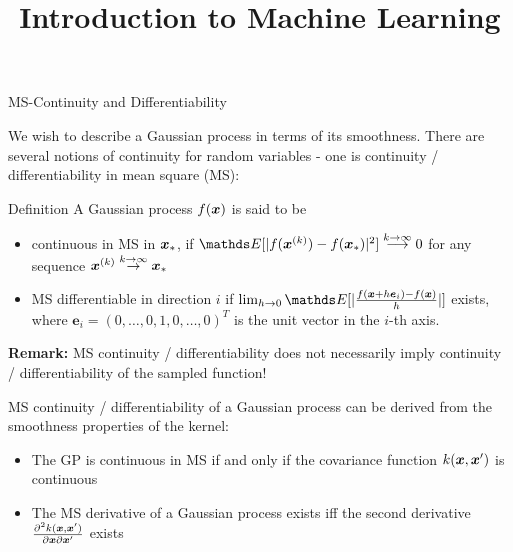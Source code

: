 




\newcommand{\titlefigure}{figure_man/up-crossings.png}
\newcommand{\learninggoals}{
  \item \textcolor{blue}{XXX}
  \item \textcolor{blue}{XXX}
}

\title{Introduction to Machine Learning}
\date{}




\begin{vbframe}{MS-Continuity and Differentiability}

We wish to describe a Gaussian process in terms of its smoothness. There are several notions of continuity for random variables - one is continuity / differentiability in mean square (MS): 

\begin{block}{Definition}
A Gaussian process $f(\bm{x})$ is said to be 
\begin{itemize}
\item continuous in MS in $\bm{x}_*$, if $\E[|f(\xv^{(k)}) - f(\xv_*)|^2] \overset{k \to \infty}{\longrightarrow} 0$ for any sequence $\bm{x}^{(k)} \overset{k \to \infty}{\to} \bm{x}_*$
\item MS differentiable in direction $i$ if $\lim_{h\to 0}\E[|\frac{f(\xv + h\bm{e}_i) - f(\xv)}{h}|]$ exists, where $\bm{e}_i = (0,\dots,0,1,0,\dots,0)^T$ is the unit vector in the $i$-th axis.
\end{itemize}
\end{block}

\textbf{Remark:} MS continuity / differentiability does not necessarily imply continuity / differentiability of the sampled function! 

\framebreak

MS continuity / differentiability of a Gaussian process can be derived from the smoothness properties of the kernel:

\begin{itemize}
\item The GP is continuous in MS if and only if the covariance function $k(\bm{x}, \bm{x}
^\prime)$ is continuous 
\item The MS derivative of a Gaussian process exists iff the second derivative $\frac{\partial^{2} k(\bm{x}, \bm{x}^\prime)}{\partial \bm{x}\partial \bm{x}^\prime}$ exists
\end{itemize}

\end{vbframe}




